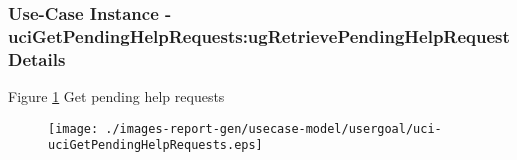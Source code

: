 
	\subsubsection{Use-Case Instance - uciGetPendingHelpRequests:ugRetrievePendingHelpRequestDetails}
	

	
	Figure \ref{fig:lu.uni.lassy.excalibur.g01.specification-RE-UC-uci-uciGetPendingHelpRequests}
	Get pending help requests 
	
	\begin{figure}[htbp]
	\begin{center}
	
	\texttt{[image: ./images-report-gen/usecase-model/usergoal/uci-uciGetPendingHelpRequests.eps]}
	\end{center}
	\caption[lu.uni.lassy.excalibur.g01.specification Sequence Diagram: uci-uciGetPendingHelpRequests]{}
	\label{fig:lu.uni.lassy.excalibur.g01.specification-RE-UC-uci-uciGetPendingHelpRequests}
	\end{figure}
	\vspace{0.5cm}
